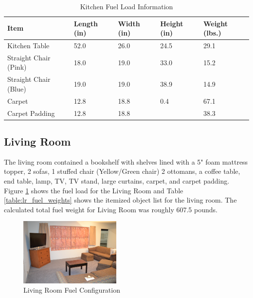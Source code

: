\documentclass[12pt,oneside]{book}
\begin{document}
\begin{table}[H]
\centering
\begin{tabular}{|L{0.3\textwidth}|C{0.08\textwidth}|C{0.08\textwidth}|C{0.08\textwidth}|C{0.08\textwidth}|}
\hline
Item 						&Length (in) 	&Width (in) 	&Height (in) 	&Weight (lbs.) 	\\ \hline \hline
Kitchen Table 				&52.0 			&26.0 			&24.5 			&29.1 			\\ \hline
Straight Chair (Pink) 		&18.0 			&19.0			&33.0 			&15.2 			\\ \hline
Straight Chair (Blue) 		&19.0 			&19.0 			&38.9	 		&14.9 			\\ \hline
Carpet 						&12.8			&18.8			&0.4			&67.1			\\ \hline
Carpet Padding 				&12.8			&18.8			&				&38.3			\\ \hline	 
\end{tabular}
\caption{Kitchen Fuel Load Information}
\label{table:kitchen_fuel_weights}
\end{table}

\clearpage

\subsection*{Living Room}
The living room contained a bookshelf with shelves lined with a 5" foam mattress topper, 2 sofas, 1 stuffed chair (Yellow/Green chair) 2 ottomans, a coffee table, end table, lamp, TV, TV stand, large curtains, carpet, and carpet padding. Figure \ref{figure:Living_Room_fuel} shows the fuel load for the Living Room and Table \ref{table:lr_fuel_weights} shows the itemized object list for the living room. The calculated total fuel weight for Living Room was roughly 607.5 pounds. 

\begin{figure}[H]
\centering
\includegraphics[width=0.45\textwidth]{../0_Images/Fuel/Living_Room.jpg}
\caption{Living Room Fuel Configuration}
\label{figure:Living_Room_fuel}
\end{figure}
\end{document}
